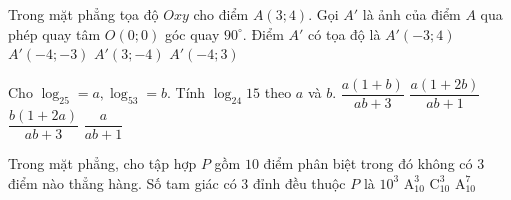 \begin{ex}%
Trong mặt phẳng tọa độ $Oxy$ cho điểm $A(3;4)$. Gọi $A'$ là ảnh của điểm $A$ qua phép quay tâm $O(0;0)$ góc quay $90^{\circ}$. Điểm $A'$ có tọa độ là
\choice
{$A'(-3;4)$}
{$A'(-4;-3)$}
{$A'(3;-4)$}
{\True $A'(-4;3)$}
\end{ex}

\begin{ex}%
Cho $\log_25=a, \log_53=b$. Tính $\log_{24}15$ theo $a$ và $b$.
\choice
{\True $\dfrac{a(1+b)}{ab+3}$}
{$\dfrac{a(1+2b)}{ab+1}$}
{$\dfrac{b(1+2a)}{ab+3}$}
{$\dfrac{a}{ab+1}$}
\end{ex}

\begin{ex}%
Trong mặt phẳng, cho tập hợp $P$ gồm $10$ điểm phân biệt trong đó không có $3$ điểm nào thẳng hàng. Số tam giác có $3$ đỉnh đều thuộc $P$ là
\choice
{$10^3$}
{$\mathrm{A}_{10}^3$}
{\True $\mathrm{C}_{10}^3$}
{$\mathrm{A}_{10}^7$}
\end{ex}

